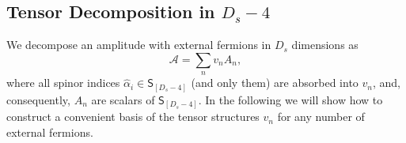 \subsection{Tensor Decomposition in \texorpdfstring{$D_s-4$}{Ds-4}}
\label{sec:HelAmplHV}

We decompose an amplitude with external fermions in $D_s$ dimensions as
\begin{equation} \label{eq:tensorDecomposition}
  \mathcal{A} = \sum_n v_n A_n,
\end{equation}
where all spinor indices $\hat{\alpha}_i \in \mathsf{S}_{[D_s-4]}$ (and only them) are absorbed into $v_n$,
and, consequently, $A_n$ are scalars of $\mathsf{S}_{[D_s-4]}$.
In the following we will show how to construct a convenient basis of the tensor structures $v_n$ 
for any number of external fermions.

